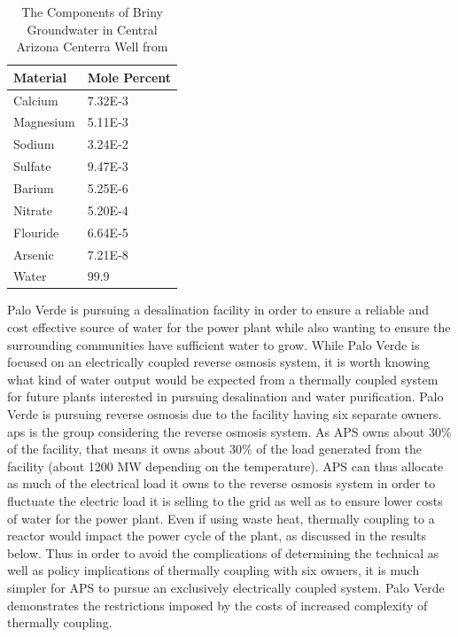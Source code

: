 \documentclass[12pt]{UIdahoMastersThesis}
\begin{document}
\begin{table}[h!]
\centering
\caption{The Components of Briny Groundwater in Central Arizona Centerra Well from \cite{USBureauofReclamation2006}}
\label{ArizonaWater}
\begin{tabular}{|l|l|}
\hline
\textbf{Material}                                                & \textbf{Mole Percent} \\ \hline
Calcium  & 7.32E-3     \\ \hline
Magnesium & 5.11E-3      \\ \hline 
Sodium & 3.24E-2\\ \hline
Sulfate & 9.47E-3 \\ \hline
Barium & 5.25E-6 \\ \hline
Nitrate & 5.20E-4 \\ \hline
Flouride & 6.64E-5 \\ \hline
Arsenic & 7.21E-8 \\ \hline
Water                                                      & 99.9         \\ \hline
\end{tabular}
\end{table}

Palo Verde is pursuing a desalination facility in order to ensure a reliable and cost effective source of water for the power plant while also wanting to ensure the surrounding communities have sufficient water to grow. While Palo Verde is focused on an electrically coupled reverse osmosis system, it is worth knowing what kind of water output would be expected from a thermally coupled system for future plants interested in pursuing desalination and water purification. Palo Verde is pursuing reverse osmosis due to the facility having six separate owners. \ac{aps} is the group considering the reverse osmosis system.  As APS owns about 30\% of the facility, that means it owns about 30\% of the load generated from the facility (about 1200 MW depending on the temperature). APS can thus allocate as much of the electrical load it owns to the reverse osmosis system in order to fluctuate the electric load it is selling to the grid as well as to ensure lower costs of water for the power plant. Even if using waste heat, thermally coupling to a reactor would impact the power cycle of the plant, as discussed in the results below. Thus in order to avoid the complications of determining the technical as well as policy implications of thermally coupling with six owners, it is much simpler for APS to pursue an exclusively electrically coupled system.  Palo Verde demonstrates the restrictions imposed by the costs of increased complexity of thermally coupling.  
\end{document}
